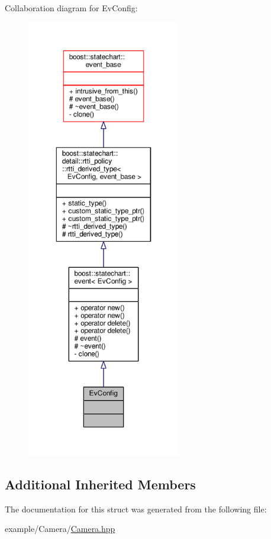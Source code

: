 Collaboration diagram for Ev\+Config\+:
\nopagebreak
\begin{figure}[H]
\begin{center}
\leavevmode
\includegraphics[height=550pt]{struct_ev_config__coll__graph}
\end{center}
\end{figure}
\subsection*{Additional Inherited Members}


The documentation for this struct was generated from the following file\+:\begin{DoxyCompactItemize}
\item 
example/\+Camera/\mbox{\hyperlink{_camera_8hpp}{Camera.\+hpp}}\end{DoxyCompactItemize}
